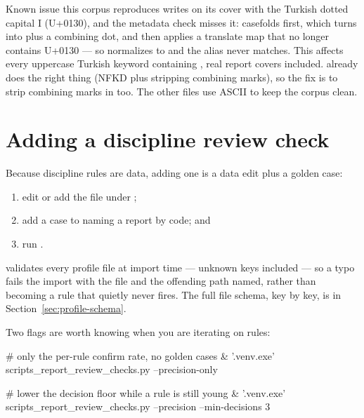 \begin{callout}{Known issue this corpus reproduces}
 writes  on its cover with the Turkish dotted
capital I (U+0130), and the metadata check misses it:
 casefolds first, which turns
 into  plus a combining dot, and then applies a translate map
that no longer contains U+0130 --- so  normalizes to
 and the alias  never matches. This
affects every uppercase Turkish keyword containing , real report covers
included.  already does the right thing (NFKD plus
stripping combining marks), so the fix is to strip combining marks in
 too. The other files use ASCII  to keep the
corpus clean.
\end{callout}

\section{Adding a discipline review check}

Because discipline rules are data, adding one is a data edit plus a golden case:

\begin{enumerate}
\item edit or add the file under
;
\item add a case to  naming a report
by code; and
\item run .
\end{enumerate}

 validates every profile file at import time ---
unknown keys included --- so a typo fails the import with the file and the
offending path named, rather than becoming a rule that quietly never fires. The
full file schema, key by key, is in Section~\ref{sec:profile-schema}.

Two flags are worth knowing when you are iterating on rules:

\begin{shellblock}
# only the per-rule confirm rate, no golden cases
& '.venv\Scripts\python.exe' scripts\run_report_review_checks.py --precision-only

# lower the decision floor while a rule is still young
& '.venv\Scripts\python.exe' scripts\run_report_review_checks.py --precision --min-decisions 3
\end{shellblock}

